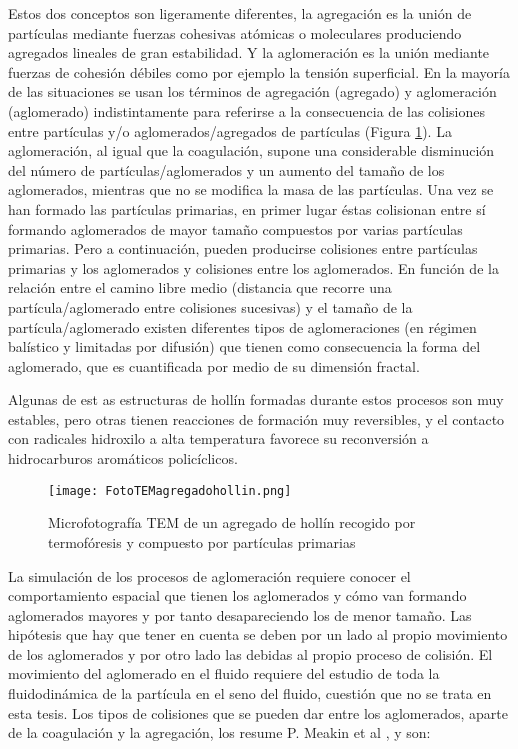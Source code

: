 \par Estos dos conceptos son ligeramente diferentes, la agregación es la unión de partículas mediante fuerzas cohesivas atómicas o moleculares produciendo agregados lineales de gran estabilidad. Y la aglomeración es la unión mediante fuerzas de cohesión débiles como por ejemplo la tensión superficial. En la mayoría de las situaciones se usan los términos de agregación (agregado) y aglomeración (aglomerado) indistintamente para referirse a la consecuencia de las colisiones entre partículas y/o aglomerados/agregados de partículas (Figura \ref{fig:fototemagregadohollin}). La aglomeración, al igual que la coagulación, supone una considerable disminución del número de partículas/aglomerados y un aumento del tamaño de los aglomerados, mientras que no se modifica la masa de las partículas. Una vez se han formado las partículas primarias, en primer lugar éstas colisionan entre sí formando aglomerados de mayor tamaño compuestos por varias partículas primarias. Pero a continuación, pueden producirse colisiones entre partículas primarias y los aglomerados y colisiones entre los aglomerados. En función de la relación entre el camino libre medio (distancia que recorre una partícula/aglomerado entre colisiones sucesivas) y el tamaño de la partícula/aglomerado existen diferentes tipos de aglomeraciones (en régimen balístico y limitadas por difusión) que tienen como consecuencia la forma del aglomerado, que es cuantificada por medio de su dimensión fractal. 
\par Algunas de est
as estructuras de hollín formadas durante estos procesos son muy estables, pero otras tienen reacciones de formación muy reversibles, y el contacto con radicales hidroxilo a alta temperatura favorece su reconversión a hidrocarburos aromáticos policíclicos.

\begin{figure}[ht]
\centering
	\texttt{[image: FotoTEMagregadohollin.png]}	 
	\caption[Microfotografía TEM de un agregado de hollín]{Microfotografía TEM de un agregado de hollín recogido por termofóresis y compuesto por partículas primarias} \label{fig:fototemagregadohollin}
\end{figure} 

\par La simulación de los procesos de aglomeración requiere conocer el comportamiento espacial que tienen los aglomerados y cómo van formando aglomerados mayores y por tanto desapareciendo los de menor tamaño. Las hipótesis que hay que tener en cuenta se deben por un lado al propio movimiento de los aglomerados y por otro lado las debidas al propio proceso de colisión. El movimiento del aglomerado en el fluido requiere del estudio de toda la fluidodinámica de la partícula en el seno del fluido, cuestión que no se trata en esta tesis. Los tipos de colisiones que se pueden dar entre los aglomerados, aparte de la coagulación y la agregación, los resume P. Meakin et al \cite{meakinetal:1989}, y son:

